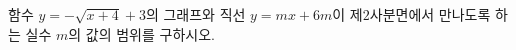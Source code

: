 \hspace*{2mm}\begin{minipage}[t]{\dimexpr\linewidth-2mm\relax}\vspace{0pt}
함수 $y=-\sqrt{x+4}+3$의 그래프와 직선 $y=mx+6m$이 제$2$사분면에서 만나도록 하는 실수 $m$의 값의 범위를 구하시오.\end{minipage}
